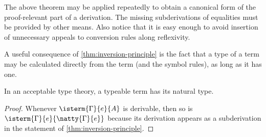 The above theorem may be applied repeatedly to obtain a canonical form of the proof-relevant part of a derivation. The missing subderivations of equalities must be provided by other means. Also notice that it is easy enough to avoid insertion of unnecessary appeals to conversion rules along reflexivity.

A useful consequence of \cref{thm:inversion-principle} is the fact that a type of a term may be calculated directly from the term (and the symbol rules), as long as it has one.

\begin{corollary}
  In an acceptable type theory, a typeable term has its natural type.
\end{corollary}

\begin{proof}
   Whenever $\isterm{\Gamma}{e}{A}$ is derivable, then so is $\isterm{\Gamma}{e}{\natty{\Gamma}{e}}$ because its derivation appears as a subderivation in the statement of
   \cref{thm:inversion-principle}.
\end{proof}










